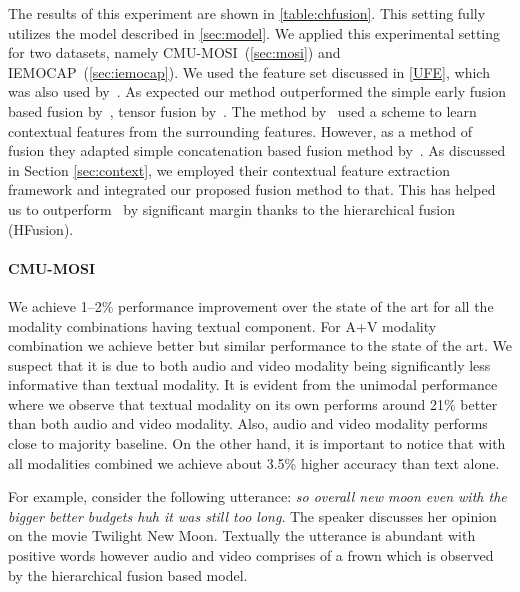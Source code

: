 \documentclass[review]{elsarticle}
\newcommand\?[1]{\hl{#1}}
\begin{document}
The results of this experiment are shown in \cref{table:chfusion}. This setting
fully utilizes the model described in \cref{sec:model}. We applied this
experimental setting for two datasets, namely CMU-MOSI~(\cref{sec:mosi}) and
IEMOCAP~(\cref{sec:iemocap}). We used the feature set discussed in \cref{UFE},
which was also used by~\citet{porcon}. As expected our method outperformed the simple early fusion based fusion by~\citep{pordee}, tensor fusion by~\citep{zadten}. The method by~\citet{porcon} used a scheme to learn contextual features from the surrounding features. However, as a method of fusion they adapted simple concatenation based fusion method by~\citep{pordee}. As discussed in Section \ref{sec:context}, we employed their contextual feature extraction framework and integrated our proposed fusion method to that. This has helped us to outperform~\citet{porcon} by significant margin thanks to the hierarchical fusion (HFusion).

\paragraph{CMU-MOSI}
We achieve 1--2\% performance improvement over the state of the art
\citep{porcon} for all the modality combinations having textual
component. For A+V modality combination we achieve better but similar
performance to the state of the art. We suspect that it is due to both audio and
video modality being significantly less informative than textual modality. It is
evident from the unimodal performance where we observe that textual modality on
its own performs around 21\% better than both audio and video modality. Also,
audio and video modality performs close to majority baseline. On the other hand,
it is important to notice that with all modalities combined we achieve about
3.5\% higher accuracy than text alone.


For example, consider the following utterance: \emph{so overall new moon even with the bigger better budgets huh it was still too long}.
The speaker discusses her opinion on the movie Twilight New Moon. Textually the
utterance is abundant with positive words however audio and video comprises of a
frown which is observed by the hierarchical fusion based model.
\end{document}
